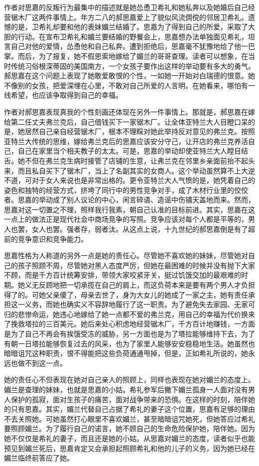 \par 作者对思嘉的反叛行为最集中的描述就是她怂恿卫希礼和她私奔以及她婚后自己经营锯木厂这两件事情上。年方二八的郝思嘉爱上了貌似风流倜傥的邻居卫希礼。遗憾的是，卫希礼却要和他的表妹媚兰结婚了。思嘉为了得到自己的所爱，采取了大胆的行动。在宣布卫希礼和媚兰要结婚的野餐会上，思嘉想办法单独面见希礼，坦言自己对他的爱情，怂恿他和自己私奔。遭到拒绝后，思嘉毫不犹豫地给了他一巴掌。而后，为了报复，她不假思索地嫁给了媚兰的哥哥查理。读者可以想象，在当时传统习俗根深蒂固的美国南方，一个女孩子要作出这样的举动要有多大的勇气。郝思嘉在这个问题上表现了她敢爱敢恨的个性，一如她一开始对白瑞德的恨意。她不像别的女孩，把爱深埋在心里，不敢对自己所爱的人言明。在她看来，哪怕有一线希望，也应该争取得到自己的幸福。
\par 作者对郝思嘉表现真我的个性刻画还体现在另外一件事情上。那就是，郝思嘉在嫁给第二任丈夫弗兰克后，自己借钱买下一家锯木厂。让全体亚特兰大人目瞪口呆的是，她居然自己亲自经营锯木厂，根本不理睬对她此举持反对意见的弗兰克。按照亚特兰大传统的思维，嫁给弗兰克后的思嘉应该安分守己，让开店的弗兰克养活自己，自己在家里当个相夫教子的太太。可是，思嘉的举动却使亚特兰大人瞠目结舌。她不但在弗兰克生病时接管了店铺的生意，让弗兰克在邻里乡亲面前抬不起头来，而且私自买下了锯木厂，当上了名副其实的女商人。这个举动虽然算不上大逆不道，可对于女人来说也是非常出格的。更令亚特兰大人气愤的是，她凭着自己的姿色和独特的经营方式，挤垮了同行中的男性竞争对手，成了木材行业里的佼佼者。思嘉的举动成了别人议论的中心，闲言碎语、造谣中伤铺天盖地而来。然而，思嘉对这一切置之不理，照样我行我素，朝自己认准的目标前进。其实，思嘉在这一点上的做法正是现代社会中商场竞争的写照。竞争应该对每个人都是平等的，男人也罢，女人也罢。强者存，弱者汰。从这点上说，十九世纪的郝思嘉倒是有了超前的竞争意识和竞争能力。
\par 思嘉性格为人称道的另外一点是她的责任心。尽管她不喜欢她的妹妹，尽管她对自己的孩子照顾不周，尽管她对黑人态度严厉，但她在最困难的时候并没有抛下大家不顾，而是千方百计统筹安排，带领大家咬紧牙关，挺过饥饿交加的最艰难的时期。她义无反顾地把一切承揽在自己的肩上，而这负荷本来是要有两个男人才负担得了的。可她父亲傻了，母亲去世了，身为大女儿的她成了一家之主，她有责任承担这一义务，而她也确实义不容辞地履行了这一职责。为了避免失去家园、无家可归的悲惨命运，她违心地嫁给了她一点都不爱的弗兰克，用自己的幸福为代价换来了挽救塔拉的三百美元。她后来处心积虑地经营锯木厂，千方百计地赚钱，一方面是为了自己不再会有挨饿受冻的威胁，另一方面也是为了塔拉能够维持下去，为了有朝一日塔拉能够恢复过去的风采，也为了家里人能够安安稳稳地生活。她虽然也暗暗诅咒这种职责，恨不得能把这些负荷通通甩掉，但是，正如希礼所说的，她永远也做不到这一点。
\par 她的责任心不但表现在她对自己亲人的照顾上，同样也表现在她对媚兰的态度上。媚兰是查理的妹妹，也就是思嘉的小姑。希礼参军后撇下媚兰孤身一人面对没有男人保护的孤寂，面对生孩子的痛苦，面对战争带来的恐惧。在这样的时刻，陪伴她的只有思嘉。其实，媚兰代替自己占据了希礼的妻子这个位置，思嘉有足够的理由不去关照她。可她虽然打心眼里不喜欢媚兰，甚至暗暗诅咒她死，但她答应过希礼要照顾媚兰。为了履行自己的诺言，她不顾自己的生命危险保护她，陪伴她。因为她不仅仅是希礼的妻子，而且还是她的小姑。从思嘉对媚兰的态度，读者似乎也能预见到媚兰死后，思嘉肯定又会承担起照顾希礼和他的儿子的义务，因为她已经在媚兰临终前答应了她。
